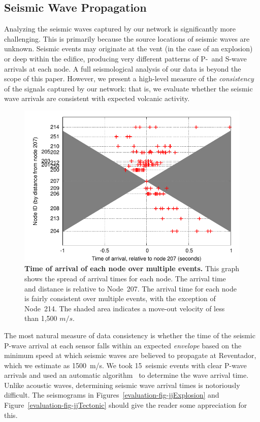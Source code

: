 \subsection{Seismic Wave Propagation}

Analyzing the seismic waves captured by our network is significantly more
challenging. This is primarily because the source locations of seismic waves
are unknown. Seismic events may originate at the vent (in the case of an
explosion) or deep within the edifice, producing very different patterns of
P-~and S-wave arrivals at each node. A full seismological analysis of our
data is beyond the scope of this paper. However, we present a high-level
measure of the \textit{consistency} of the signals captured by our network:
that is, we evaluate whether the seismic wave arrivals are consistent with
expected volcanic activity.

\begin{figure}[t]
\begin{center}
\includegraphics[width=0.8\hsize]{./5-evaluation/figs/fidelity/seismicArrival/arrivalTimesPlotScatteredNode.pdf}
\end{center}
\caption{\textbf{Time of arrival of each node over multiple events.}
This graph shows the spread of arrival times for each node. The arrival time
and distance is relative to Node~207. The arrival time for each node is
fairly consistent over multiple events, with the exception of Node~214.  The
shaded area indicates a move-out velocity of less than 1,500 $m/s$.}
\label{evaluation-fig-seismicArrivalScatteredNode}
\end{figure}

The most natural measure of data consistency is whether the time of the
seismic P-wave arrival at each sensor falls within an expected
\textit{envelope} based on the minimum speed at which seismic waves are
believed to propagate at Reventador, which we estimate as 1500~m/s. We took
15~seismic events with clear P-wave arrivals and used an automatic
algorithm~\cite{pwave-picking} to determine the wave arrival time. Unlike
acoustic waves, determining seismic wave arrival times is notoriously
difficult. The seismograms in Figures~\ref{evaluation-fig-jjExplosion} and
Figure~\ref{evaluation-fig-jjTectonic} should give the reader some
appreciation for this.

